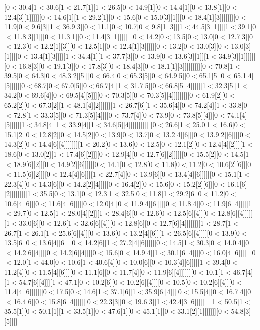 [0$<$30.4[1$<$30.6[1$<$21.7[1][1$<$26.5[0$<$14.9[1][0$<$14.4[1][0$<$13.8[1][0$<$12.4[3][1]]]]][0$<$14.6[1][1$<$29.2[1][0$<$15.6[0$<$15.0[3][1]][0$<$18.4[1][3]]]]]]][0$<$11.9[0$<$9.6[3][1$<$36.9[3][0$<$11.1[0$<$10.7[0$<$9.8[1][3]][1$<$44.5[3][1]]][1$<$39.1[0$<$11.8[3][1]][0$<$11.3[1][0$<$11.4[3][1]]]]]]][0$<$14.2[0$<$13.5[0$<$13.0[0$<$12.7[3][0$<$12.3[0$<$12.2[1][3]][0$<$12.5[1][0$<$12.4[1][3]]]]][0$<$13.2[0$<$13.0[3][0$<$13.0[3][1]]][0$<$13.4[1][3]]]][1$<$34.4[1][1$<$37.7[3][0$<$13.9[0$<$13.6[3][1]][1$<$34.9[3][1]]]]]][0$<$16.8[3][0$<$19.1[3][0$<$17.8[3][0$<$18.4[3][0$<$18.1[1][3]]]]]]]]][0$<$70.8[1$<$39.5[0$<$64.3[0$<$48.3[2][5]][0$<$66.4[0$<$65.3[5][0$<$64.9[5][0$<$65.1[5][0$<$65.1[4][5]]]]][0$<$68.7[0$<$67.0[5][0$<$66.7[4][1$<$31.7[5][0$<$66.8[5][4]]]]][1$<$32.3[5][1$<$34.2[0$<$69.6[4][0$<$69.5[4][5]]][0$<$70.3[5][0$<$70.3[5][4]]]]]]]][0$<$61.9[2][0$<$65.2[2][0$<$67.3[2][1$<$48.1[4][2]]]]]][1$<$26.7[6][1$<$35.6[4][0$<$74.2[4][1$<$33.8[0$<$72.8[1$<$33.3[5][0$<$71.3[5][4]]][0$<$73.7[4][0$<$73.9[0$<$73.8[5][4]][0$<$74.1[4][5]]]]][1$<$34.8[4][1$<$33.9[4][1$<$34.6[5][4]]]]]]]]]]
[0$<$26.6[1$<$25.0[1$<$16.6[0$<$15.1[2][0$<$12.8[2][0$<$14.5[2][0$<$13.9[0$<$13.7[0$<$13.2[4][6]][0$<$13.9[2][6]]][0$<$14.3[2][0$<$14.4[6][4]]]]]]][1$<$20.2[0$<$13.6[0$<$12.5[0$<$12.1[2][0$<$12.4[4][2]]][1$<$18.6[0$<$13.0[2][1$<$17.4[6][2]]][0$<$12.9[4][0$<$12.7[6][2]]]]][0$<$15.5[2][0$<$14.5[1$<$18.9[6][2]][0$<$14.9[2][6]]]]][0$<$14.1[0$<$12.8[0$<$11.8[0$<$11.2[0$<$10.6[2][6]][0$<$11.5[6][2]]][0$<$12.4[4][6]]][1$<$22.7[4][0$<$13.9[6][0$<$13.4[4][6]]]]][0$<$15.1[1$<$22.3[4][0$<$14.3[6][0$<$14.2[2][4]]]][0$<$16.4[2][0$<$15.6[0$<$15.2[2][6]][0$<$16.1[6][2]]]]]]]][1$<$35.5[0$<$13.1[0$<$12.3[1$<$32.5[0$<$11.8[1$<$29.2[6][0$<$11.2[0$<$10.6[4][6]][0$<$11.6[4][6]]]][0$<$12.0[4][0$<$11.9[4][6]]]][0$<$11.8[4][0$<$11.9[6][4]]]][1$<$29.7[0$<$12.5[1$<$28.0[4][2]][1$<$28.4[6][0$<$12.6[0$<$12.5[6][4]][0$<$12.8[6][4]]]]][1$<$33.0[6][0$<$12.6[1$<$32.6[6][4]][0$<$12.8[6][0$<$12.7[6][4]]]]]]][1$<$28.7[1$<$26.7[1$<$26.1[1$<$25.6[6][4]][0$<$13.6[0$<$13.2[4][6]][1$<$26.5[6][4]]]][0$<$13.9[0$<$13.5[6][0$<$13.6[4][6]]][0$<$14.2[6][1$<$27.2[4][6]]]]][0$<$14.5[1$<$30.3[0$<$14.0[4][0$<$14.2[6][4]]][0$<$14.2[6][4]]][0$<$15.6[0$<$14.9[4][1$<$30.1[6][4]]][0$<$16.0[4][6]]]]]][0$<$12.0[1$<$44.0[0$<$10.6[1$<$40.6[4][0$<$10.0[6][0$<$10.3[4][6]]]][1$<$39.4[0$<$11.2[4][0$<$11.5[4][6]]][0$<$11.1[6][0$<$11.7[4][0$<$11.9[6][4]]]]]][0$<$10.1[1$<$46.7[4][1$<$54.7[6][4]]][1$<$47.1[0$<$10.2[6][0$<$10.2[6][4]]][0$<$10.5[0$<$10.2[6][4]][0$<$11.4[4][6]]]]]][0$<$17.5[0$<$14.6[1$<$37.1[6][1$<$35.9[6][4]]][0$<$15.5[4][0$<$16.7[4][0$<$16.4[6][0$<$15.8[6][4]]]]]][0$<$22.3[3][0$<$19.6[3][1$<$42.4[3][6]]]]]]]][1$<$50.5[1$<$35.5[1][0$<$50.1[1][1$<$33.5[1][0$<$47.6[1][0$<$45.1[1][0$<$33.1[2][1]]]]]]][0$<$54.8[3][5]]]]

